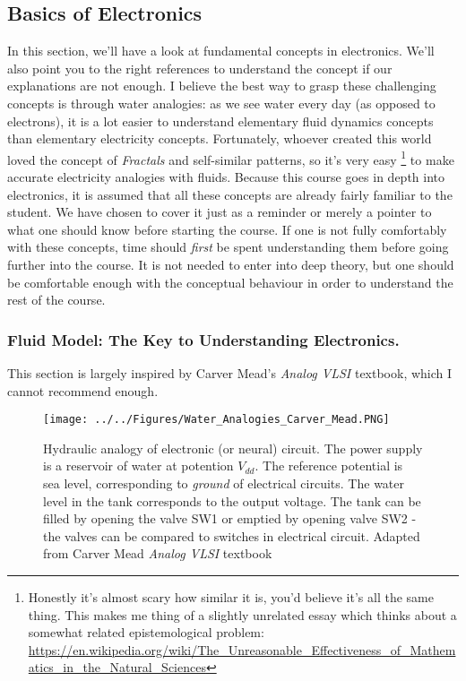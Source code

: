 \subsection{Basics of Electronics}

In this section, we'll have a look at fundamental concepts in electronics.  We'll also point you to the right references to understand the concept if our explanations are not enough. I believe the best way to grasp these challenging concepts is through water analogies: as we see water every day (as opposed to electrons), it is a lot easier to understand elementary fluid dynamics concepts than elementary electricity concepts. Fortunately, whoever created this world loved the concept of \textit{Fractals} and self-similar patterns, so it's very easy \footnote{Honestly it's almost scary how similar it is, you'd believe it's all the same thing. This makes me thing of a slightly unrelated essay which thinks about a somewhat related epistemological problem: \url{https://en.wikipedia.org/wiki/The_Unreasonable\_Effectiveness\_of\_Mathematics\_in\_the\_Natural\_Sciences}} to make accurate electricity analogies with fluids.  
Because this course goes in depth into electronics, it is assumed that all these concepts are already fairly familiar to the student. We have chosen to cover it just as a reminder or merely a pointer to what one should know before starting the course. If one is not fully comfortably with these concepts, time should \textit{first} be spent understanding them before going further into the course. It is not needed to enter into deep theory, but one should be comfortable enough with the conceptual behaviour in order to understand the rest of the course. 

\subsubsection{Fluid Model: The Key to Understanding Electronics.}

This section is largely inspired by Carver Mead's \textit{Analog VLSI} textbook, which I cannot recommend enough. 

\begin{figure}[H]
    \centering
    \texttt{[image: ../../Figures/Water\_Analogies\_Carver\_Mead.PNG]}
    \caption{Hydraulic analogy of electronic (or neural) circuit. The power supply is a reservoir of water at potention $V_{dd}$. The reference potential is sea level, corresponding to \textit{ground} of electrical circuits. The water level in the tank corresponds to the output voltage. The tank can be filled by opening the valve SW1 or emptied by opening valve SW2 - the valves can be compared to switches in electrical circuit. Adapted from Carver Mead \textit{Analog VLSI} textbook}
    \label{fig:Hydraulic Anlogy}
\end{figure}

